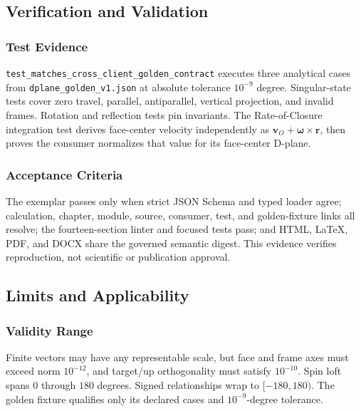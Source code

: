 \documentclass[
  american,
]{article}
\begin{document}
\subsection{Verification and
Validation}\label{verification-and-validation}

\subsubsection{Test Evidence}\label{test-evidence}

\texttt{test\_matches\_cross\_client\_golden\_contract} executes three
analytical cases from \texttt{dplane\_golden\_v1.json} at absolute
tolerance \(10^{-9}\) degree. Singular-state tests cover zero travel,
parallel, antiparallel, vertical projection, and invalid frames.
Rotation and reflection tests pin invariants. The Rate-of-Closure
integration test derives face-center velocity independently as
\(\mathbf v_O+\boldsymbol\omega\times\mathbf r\), then proves the
consumer normalizes that value for its face-center D-plane.

\subsubsection{Acceptance Criteria}\label{acceptance-criteria}

The exemplar passes only when strict JSON Schema and typed loader agree;
calculation, chapter, module, source, consumer, test, and golden-fixture
links all resolve; the fourteen-section linter and focused tests pass;
and HTML, LaTeX, PDF, and DOCX share the governed semantic digest. This
evidence verifies reproduction, not scientific or publication approval.

\subsection{Limits and Applicability}\label{limits-and-applicability}

\subsubsection{Validity Range}\label{validity-range}

Finite vectors may have any representable scale, but face and frame axes
must exceed norm \(10^{-12}\), and target/up orthogonality must satisfy
\(10^{-10}\). Spin loft spans \(0\) through \(180\) degrees. Signed
relationships wrap to \([-180,180)\). The golden fixture qualifies only
its declared cases and \(10^{-9}\)-degree tolerance.
\end{document}
